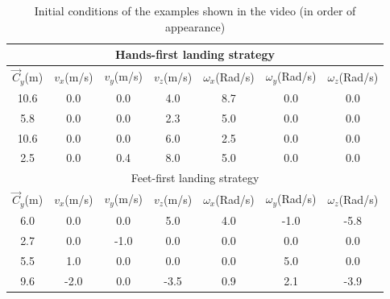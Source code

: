 \begin{table}
\center
{
\caption{
  Initial conditions of the examples shown in the video (in order of appearance)
}
\begin{tabular}{| c| c|  c| c|  c| c| c|}

\hline

\multicolumn{7}{|c|}{\small Hands-first landing strategy} \\ \hline

  {\small \textbf{$\vec{C}_y$}}{\tiny(m)} 
  & {\small \textbf{$v_x$}}{\tiny(m/s)}  
  & {\small \textbf{$v_y$}}{\tiny(m/s)}  
  & {\small \textbf{$v_z$}}\tiny{(m/s)} 
  & {\small \textbf{$\omega_x$}}{\tiny(Rad/s)} 
  & {\small \textbf{$\omega_y$}}{\tiny(Rad/s)} 
  & {\small \textbf{$\omega_z$}}{\tiny(Rad/s)} \\ \hline


{\small 10.6} & {\small 0.0} & {\small 0.0} & {\small 4.0} & {\small 8.7} & {\small 0.0} & {\small 0.0} \\ \hline
{\small 5.8} & {\small 0.0} & {\small 0.0} & {\small 2.3} & {\small 5.0} & {\small 0.0} & {\small 0.0} \\ \hline
{\small 10.6} & {\small 0.0} & {\small 0.0} & {\small 6.0} & {\small 2.5} & {\small 0.0} & {\small 0.0} \\ \hline
{\small 2.5} & {\small 0.0} & {\small 0.4} & {\small 8.0} & {\small 5.0} & {\small 0.0} & {\small 0.0} \\ \hline

\hline

\multicolumn{7}{|c|}{\small Feet-first landing strategy}   \\\hline

  {\small \textbf{$\vec{C}_y$}}{\tiny(m)} 
  & {\small \textbf{$v_x$}}{\tiny(m/s)}  
  & {\small \textbf{$v_y$}}{\tiny(m/s)}  
  & {\small \textbf{$v_z$}}\tiny{(m/s)} 
  & {\small \textbf{$\omega_x$}}{\tiny(Rad/s)} 
  & {\small \textbf{$\omega_y$}}{\tiny(Rad/s)} 
  & {\small \textbf{$\omega_z$}}{\tiny(Rad/s)} \\ \hline


{\small 6.0} & {\small 0.0} & {\small 0.0} & {\small 5.0} & {\small 4.0} & {\small -1.0} & {\small -5.8} \\ \hline
{\small 2.7} & {\small 0.0} & {\small -1.0} & {\small 0.0} & {\small 0.0} & {\small 0.0} & {\small 0.0} \\ \hline
{\small 5.5} & {\small 1.0} & {\small 0.0} & {\small 0.0} & {\small 0.0} & {\small 5.0} & {\small 0.0} \\ \hline
{\small 9.6} & {\small -2.0} & {\small 0.0} & {\small -3.5} & {\small 0.9} & {\small 2.1} & {\small -3.9} \\ \hline

\end{tabular}
\label{tab:landing_initialConditions}
}
\end{table}



